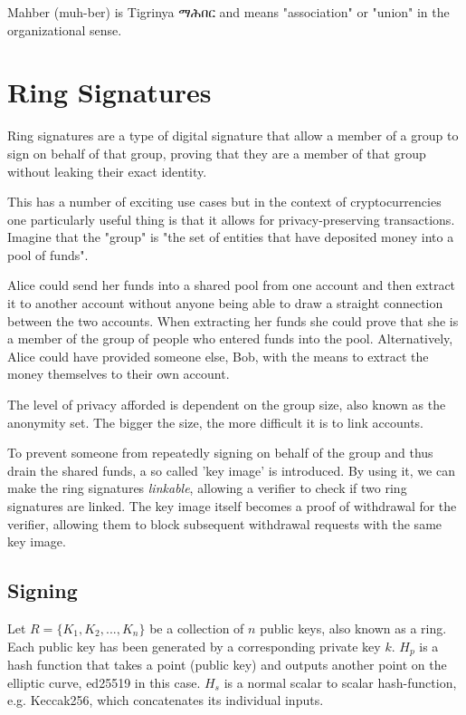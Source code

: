 \documentclass[9pt]{article}
\newenvironment{geez}
  {\geezfont}
  {}
\begin{document}
Mahber (muh-ber) is Tigrinya \begin{geez}ማሕበር\end{geez} and means "association" or "union" in the organizational sense.

\section{Ring Signatures}

Ring signatures are a type of digital signature that allow a member of a group to sign on behalf of that group, proving that they are a member of that group without leaking their exact identity. 

This has a number of exciting use cases but in the context of cryptocurrencies one particularly useful thing is that it allows for privacy-preserving transactions. Imagine that the "group" is "the set of entities that have deposited money into a pool of funds".

Alice could send her funds into a shared pool from one account and then extract it to another account without anyone being able to draw a straight connection between the two accounts. When extracting her funds she could prove that she is a member of the group of people who entered funds into the pool. Alternatively, Alice could have provided someone else, Bob, with the means to extract the money themselves to their own account.

The level of privacy afforded is dependent on the group size, also known as the anonymity set. The bigger the size, the more difficult it is to link accounts.

To prevent someone from repeatedly signing on behalf of the group and thus drain the shared funds, a so called 'key image' is introduced. By using it, we can make the ring signatures \textit{linkable}, allowing a verifier to check if two ring signatures are linked. The key image itself becomes a proof of withdrawal for the verifier, allowing them to block subsequent withdrawal requests with the same key image.


\subsection{Signing}
Let $R = \{K_1, K_2, ..., K_n\}$ be a collection of $n$ public keys, also known as a ring. Each public key has been generated by a corresponding private key $k$. $H_p$ is a hash function that takes a point (public key) and outputs another point on the elliptic curve, ed25519 in this case. $H_s$ is a normal scalar to scalar hash-function, e.g. Keccak256, which concatenates its individual inputs. 
\end{document}

